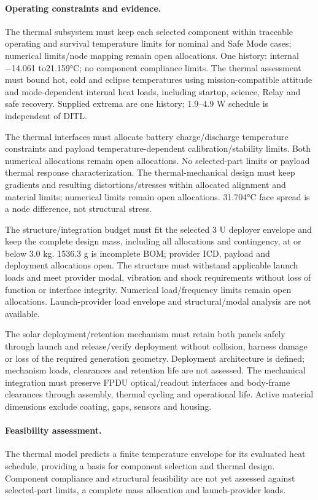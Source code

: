 \paragraph{Operating constraints and evidence.} 
The thermal subsystem must keep each selected component within traceable operating and survival temperature limits for nominal and Safe Mode cases; numerical limits/node mapping remain open allocations. One history: internal −14.061 to21.159°C; no component compliance limits.
The thermal assessment must bound hot, cold and eclipse temperatures using mission-compatible attitude and mode-dependent internal heat loads, including startup, science, Relay and safe recovery. Supplied extrema are one history; 1.9–4.9 W schedule is independent of DITL.

The thermal interfaces must allocate battery charge/discharge temperature constraints and payload temperature-dependent calibration/stability limits. Both numerical allocations remain open allocations. No selected-part limits or payload thermal response characterization.
The thermal-mechanical design must keep gradients and resulting distortions/stresses within allocated alignment and material limits; numerical limits remain open allocations. 31.704°C face spread is a node difference, not structural stress.

The structure/integration budget must fit the selected 3 U deployer envelope and keep the complete design mass, including all allocations and contingency, at or below 3.0 kg. 1536.3 g is incomplete BOM; provider ICD, payload and deployment allocations open.
The structure must withstand applicable launch loads and meet provider modal, vibration and shock requirements without loss of function or interface integrity. Numerical load/frequency limits remain open allocations. Launch-provider load envelope and structural/modal analysis are not available.

The solar deployment/retention mechanism must retain both panels safely through launch and release/verify deployment without collision, harness damage or loss of the required generation geometry. Deployment architecture is defined; mechanism loads, clearances and retention life are not assessed.
The mechanical integration must preserve FPDU optical/readout interfaces and body-frame clearances through assembly, thermal cycling and operational life. Active material dimensions exclude coating, gaps, sensors and housing.

\paragraph{Feasibility assessment.} The thermal model predicts a finite temperature envelope for its evaluated heat schedule, providing a basis for component selection and thermal design. Component compliance and structural feasibility are not yet assessed against selected-part limits, a complete mass allocation and launch-provider loads.
